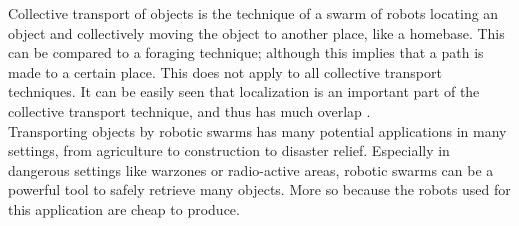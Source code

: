 
Collective transport of objects is the technique of a swarm of robots locating an object and collectively moving the object to another place, like a homebase. 
This can be compared to a foraging technique; although this implies that a path is made to a certain place. 
This does not apply to all collective transport techniques. \cite{hoff2010two}  
It can be easily seen that localization is an important part of the collective transport technique, and thus has much overlap .\\
Transporting objects by robotic swarms has many potential applications in many settings, from agriculture to construction to disaster relief. 
Especially in dangerous settings like warzones or radio-active areas, robotic swarms can be a powerful tool to safely retrieve many objects. 
More so because the robots used for this application are cheap to produce. 



